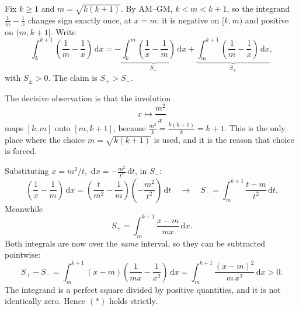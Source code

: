 \documentclass[12pt]{article}
\newcommand{\dd}{\,\mathrm{d}}
\newcommand{\Mid}{m}
\begin{document}
Fix \(k\ge1\) and \(\Mid=\sqrt{k(k+1)}\). By AM--GM,
\(k<\Mid<k+1\), so the integrand \(\frac1{\Mid}-\frac1x\) changes sign
exactly once, at \(x=\Mid\): it is negative on \([k,\Mid)\) and positive
on \((\Mid,k+1]\). Write
\[
\int_k^{k+1}\left(\frac1{\Mid}-\frac1x\right)\dd x
=-\underbrace{\int_k^{\Mid}\left(\frac1x-\frac1{\Mid}\right)\dd x}_{S_-}
+\underbrace{\int_{\Mid}^{k+1}\left(\frac1{\Mid}-\frac1x\right)\dd x}_{S_+},
\tag{3}
\]
with \(S_\pm>0\). The claim is \(S_+>S_-\).

The decisive observation is that the involution
\[
x\longmapsto\frac{\Mid^2}{x}
\]
maps \([k,\Mid]\) onto \([\Mid,k+1]\), because
\(\frac{\Mid^2}{k}=\frac{k(k+1)}{k}=k+1\). This is the only place where
the choice \(\Mid=\sqrt{k(k+1)}\) is used, and it is the reason that
choice is forced.

Substituting \(x=\Mid^2/t\), \(\dd x=-\frac{\Mid^2}{t^2}\dd t\), in
\(S_-\):
\[
\left(\frac1x-\frac1{\Mid}\right)\dd x
=\left(\frac{t}{\Mid^2}-\frac1{\Mid}\right)\left(-\frac{\Mid^2}{t^2}\right)\dd t
\quad\longrightarrow\quad
S_-=\int_{\Mid}^{k+1}\frac{t-\Mid}{t^2}\dd t .
\tag{4}
\]
Meanwhile
\[
S_+=\int_{\Mid}^{k+1}\frac{x-\Mid}{\Mid x}\dd x .
\tag{5}
\]
Both integrals are now over the \emph{same} interval, so they can be
subtracted pointwise:
\[
S_+-S_-
=\int_{\Mid}^{k+1}(x-\Mid)\left(\frac1{\Mid x}-\frac1{x^2}\right)\dd x
=\int_{\Mid}^{k+1}\frac{(x-\Mid)^2}{\Mid\,x^2}\dd x>0 .
\tag{6}
\]
The integrand is a perfect square divided by positive quantities, and it
is not identically zero. Hence \((\ast)\) holds strictly.

\begin{center}
\end{center}
\end{document}
